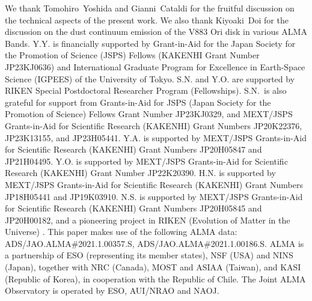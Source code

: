 \documentclass[linenumbers, twocolumn, twocolappendix, astrosymb, times]{aastex631}
\begin{document}
\begin{acknowledgments}
We thank Tomohiro~Yoshida and Gianni~Cataldi for the fruitful discussion on the technical aspects of the present work. We also thank Kiyoaki~Doi for the discussion on the dust continuum emission of the V883 Ori disk in various ALMA Bands. 
Y.Y. is financially supported by Grant-in-Aid for the Japan
Society for the Promotion of Science (JSPS) Fellows (KAKENHI Grant Number JP23KJ0636) and International Graduate Program for Excellence in Earth-Space Science (IGPEES) of the University of Tokyo.
S.N. and Y.O. are supported by RIKEN Special Postdoctoral Researcher Program (Fellowships).
S.N.~is also grateful for support from Grants-in-Aid for JSPS (Japan Society for the Promotion of Science) Fellows Grant Number JP23KJ0329, and MEXT/JSPS Grants-in-Aid for Scientific Research (KAKENHI) Grant Numbers JP20K22376, JP23K13155, and JP23H05441.
Y.A. is supported by MEXT/JSPS Grants-in-Aid for Scientific Research (KAKENHI) Grant Numbers JP20H05847 and JP21H04495.
Y.O. is supported by MEXT/JSPS Grants-in-Aid for Scientific Research (KAKENHI) Grant Number JP22K20390.
H.N. is supported by MEXT/JSPS Grants-in-Aid for Scientific Research (KAKENHI) Grant Numbers JP18H05441 and JP19K03910.
N.S. is supported by MEXT/JSPS Grants-in-Aid for Scientific Research (KAKENHI) Grant Numbers JP20H05845 and JP20H00182, and a pioneering project in RIKEN (Evolution of Matter in the Universe) .
This paper makes use of the following ALMA data: ADS/JAO.ALMA\#2021.1.00357.S, ADS/JAO.ALMA\#2021.1.00186.S. %
ALMA is a partnership of ESO (representing its member states), NSF (USA) and NINS (Japan), together with NRC (Canada), MOST and ASIAA (Taiwan), and KASI (Republic of Korea), in cooperation with the Republic of Chile. The Joint ALMA Observatory is operated by ESO, AUI/NRAO and NAOJ. 

\end{acknowledgments}

%
\end{document}
